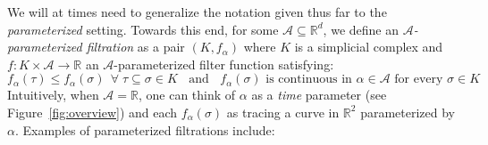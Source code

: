 We will at times need to generalize the notation given thus far to the \emph{parameterized} setting. Towards this end, for some $\mathcal{A} \subseteq \mathbb{R}^d$, we define an \emph{$\mathcal{A}$-parameterized filtration} as a pair $(K, f_\alpha)$ where $K$ is a simplicial complex and $f : K \times \mathcal{A} \to \mathbb{R}$ an $\mathcal{A}$-parameterized filter function satisfying:
\begin{equation}
f_\alpha(\tau) \leq f_\alpha(\sigma) \;\, \forall \; \tau \subseteq \sigma \in K  \;\; \text{ and } \; \; f_\alpha(\sigma) \text{ is continuous in } \alpha \in \mathcal{A} \text{ for every } \sigma \in K
\end{equation}
Intuitively, when $\mathcal{A} = \mathbb{R}$, one can think of $\alpha$ as a \emph{time} parameter (see Figure~\ref{fig:overview}) and each $f_\alpha(\sigma)$ as tracing a curve in $\mathbb{R}^2$ parameterized by $\alpha$.  
Examples of parameterized filtrations include:
